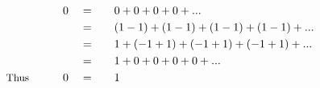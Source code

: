 \begin{alignat*}{5}
&\,&0\quad&=\quad&&0+0+0+0+...\\
&\,&\,&=&&(1-1)+(1-1)+(1-1)+(1-1)+...\\
&\,&\,&=&&1+(-1+1)+(-1+1)+(-1+1)+...\\
&\,&\,&=&&1+0+0+0+0+...\\
&\small\text{Thus}\normalsize\qquad&0\quad&=&&1
\end{alignat*}
